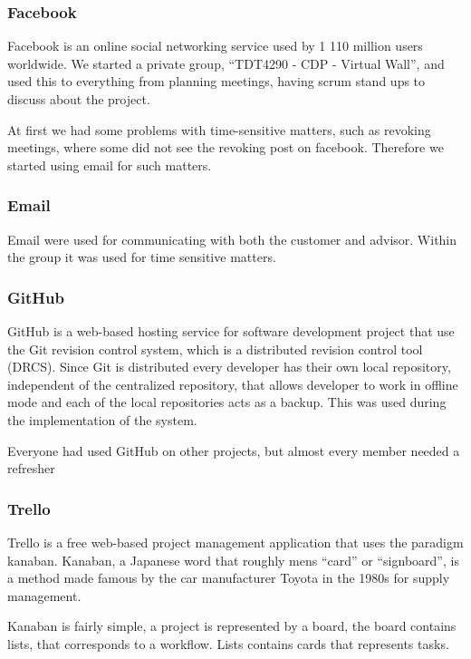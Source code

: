 \documentclass[11pt]{book}
\begin{document}
\subsubsection{Facebook}
Facebook is an online social networking service used by 1 110 million users worldwide\cite{facebook}. We started a private group, ``TDT4290 - CDP - Virtual Wall'', and used this to everything from planning meetings, having scrum stand ups to discuss about the project. 

At first we had some problems with time-sensitive matters, such as revoking meetings, where some did not see the revoking post on facebook. Therefore we started using email for such matters.

\subsubsection{Email}
Email were used for communicating with both the customer and advisor. Within the group it was used for time sensitive matters.

\subsubsection{GitHub}
GitHub\cite{github} is a web-based hosting service for software development project that use the Git revision control system, which is a distributed revision control tool (DRCS). Since Git is distributed every developer has their own local repository, independent of the centralized repository, that allows developer to work in offline mode and each of the local repositories acts as a backup. This was used during the implementation of the system.

Everyone had used GitHub on other projects, but almost every member needed a refresher

\subsubsection{Trello}
Trello\cite{trello} is a free web-based project management application that uses the paradigm kanaban. Kanaban, a Japanese word that roughly mens ``card'' or ``signboard'', is a method made famous by the car manufacturer Toyota in the 1980s for supply management. 

Kanaban is fairly simple, a project is represented by a board, the board contains lists, that corresponds to a workflow. Lists contains cards that represents tasks.
\end{document}
